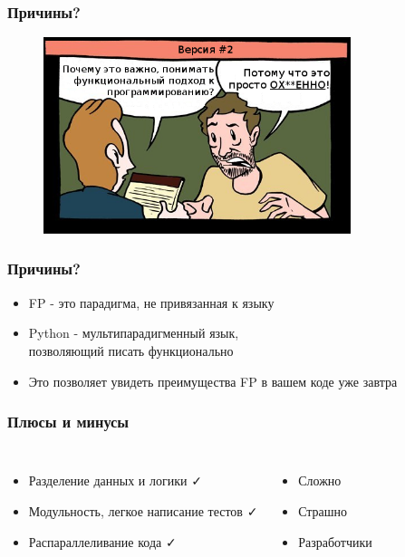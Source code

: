 \documentclass[18pt, compress]{beamer}
\def\check{\textcolor{check}{\FA \faCheck}}
\def\fail{\textcolor{fail}{\FA \faRemove}}
\begin{document}
\begin{frame}
    \frametitle{Причины?}
    \vspace{-25pt}
    \begin{figure}
        \includegraphics[width=0.8\textwidth,center]{second_option.png}
    \end{figure}
\end{frame}

\begin{frame}[fragile]
    \frametitle{Причины?}
    \begin{itemize}[label={\MVRightarrow}]
        \item FP - это парадигма, не привязанная к языку
        \item Python - мультипарадигменный язык,\\ позволяющий писать функционально
        \item Это позволяет увидеть преимущества FP в вашем коде уже завтра
    \end{itemize}
\end{frame}

\fontsize{15pt}{16}\selectfont
\begin{frame}
    \frametitle{Плюсы и минусы}
    \vspace{-20pt}
    \begin{columns}[T,onlytextwidth]
    \begin{itemize}[label={\MVRightarrow}, leftmargin=-0.05cm]
            \item <+->Разделение данных и логики \check
            \item <+->Модульность, легкое написание тестов \check
            \item <+->Распараллеливание кода \check
        \end{itemize}

        \begin{itemize}[label={\MVRightarrow}]
            \item <+->Сложно \fail
            \item <+->Страшно \fail
            \item <+->Разработчики \fail
        \end{itemize}
    \end{columns}
\end{frame}
\fontsize{17pt}{18}\selectfont
\end{document}
